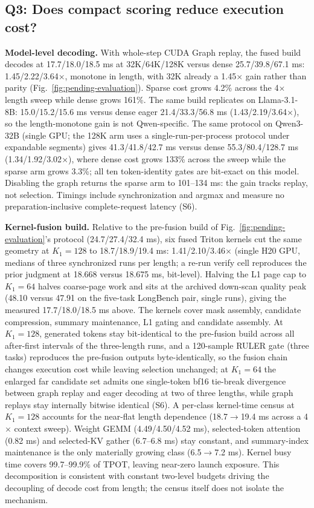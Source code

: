 \documentclass[conference,9pt,letterpaper]{IEEEtran}
\begin{document}
\subsection{Q3: Does compact scoring reduce execution cost?}
\textbf{Model-level decoding.} With whole-step CUDA Graph replay, the fused build decodes at 17.7/18.0/18.5 ms at 32K/64K/128K versus dense 25.7/39.8/67.1 ms: 1.45/2.22/3.64$\times$, monotone in length, with 32K already a 1.45$\times$ gain rather than parity (Fig.~\ref{fig:pending-evaluation}). Sparse cost grows 4.2\% across the 4$\times$ length sweep while dense grows 161\%. The same build replicates on Llama-3.1-8B: 15.0/15.2/15.6 ms versus dense eager 21.4/33.3/56.8 ms (1.43/2.19/3.64$\times$), so the length-monotone gain is not Qwen-specific. The same protocol on Qwen3-32B (single GPU; the 128K arm uses a single-run-per-process protocol under expandable segments) gives 41.3/41.8/42.7 ms versus dense 55.3/80.4/128.7 ms (1.34/1.92/3.02$\times$), where dense cost grows 133\% across the sweep while the sparse arm grows 3.3\%; all ten token-identity gates are bit-exact on this model. Disabling the graph returns the sparse arm to 101--134 ms: the gain tracks replay, not selection. Timings include synchronization and argmax and measure no preparation-inclusive complete-request latency (S6).

\textbf{Kernel-fusion build.} Relative to the pre-fusion build of Fig.~\ref{fig:pending-evaluation}'s protocol (24.7/27.4/32.4 ms), six fused Triton kernels cut the same geometry at $K_1{=}128$ to 18.7/18.9/19.4 ms: 1.41/2.10/3.46$\times$ (single H20 GPU, medians of three synchronized runs per length; a re-run verify cell reproduces the prior judgment at 18.668 versus 18.675 ms, bit-level). Halving the L1 page cap to $K_1{=}64$ halves coarse-page work and sits at the archived down-scan quality peak (48.10 versus 47.91 on the five-task LongBench pair, single runs), giving the measured 17.7/18.0/18.5 ms above. The kernels cover mask assembly, candidate compression, summary maintenance, L1 gating and candidate assembly. At $K_1{=}128$, generated tokens stay bit-identical to the pre-fusion build across all after-first intervals of the three-length runs, and a 120-sample RULER gate (three tasks) reproduces the pre-fusion outputs byte-identically, so the fusion chain changes execution cost while leaving selection unchanged; at $K_1{=}64$ the enlarged far candidate set admits one single-token bf16 tie-break divergence between graph replay and eager decoding at two of three lengths, while graph replays stay internally bitwise identical (S6). A per-class kernel-time census at $K_1{=}128$ accounts for the near-flat length dependence (18.7$\rightarrow$19.4 ms across a 4$\times$ context sweep). Weight GEMM (4.49/4.50/4.52 ms), selected-token attention (0.82 ms) and selected-KV gather (6.7--6.8 ms) stay constant, and summary-index maintenance is the only materially growing class (6.5$\rightarrow$7.2 ms). Kernel busy time covers 99.7--99.9\% of TPOT, leaving near-zero launch exposure. This decomposition is consistent with constant two-level budgets driving the decoupling of decode cost from length; the census itself does not isolate the mechanism.
\end{document}
